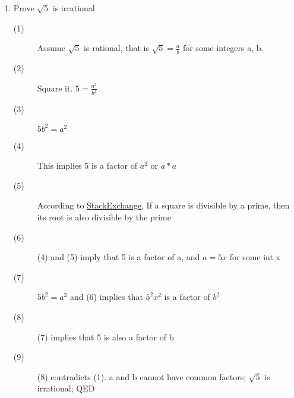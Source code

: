\documentclass[11pt]{article}
\begin{document}
\begin{enumerate}
        \item Prove $\sqrt{5}$ is irrational
            \begin{description}
                \item[(1)] Assume $\sqrt{5}$ is rational, that is $\sqrt{5}=\frac{a}{b}$ for some integers a, b.
                \item[(2)] Square it. $5 = \frac{a^2}{b^2}$
                \item[(3)] $5b^2 = a^2$
                \item[(4)] This implies 5 is a factor of $a^2$ or $a * a$
                \item[(5)] According to \href{https://math.stackexchange.com/questions/4268/alternate-definition-of-prime-number#:~:text=A\%20prime\%20is\%20a\%20quantity,is\%20a\%20factor\%20of\%20b.}{StackExchange}, If a square is divisible by a prime, then its root is also divisible by the prime
                \item[(6)] (4) and (5) imply that 5 is a factor of a, and $a = 5x$ for some int x
                \item[(7)] $5b^2 = a^2$ and (6) implies that $5^2x^2$ is a factor of $b^2$
                \item[(8)] (7) implies that 5 is also a factor of b.
                \item[(9)] (8) contradicts (1). a and b cannot have common factors; $\sqrt{5}$ is irrational; QED
            \end{description}
    \end{enumerate}
\end{document}
